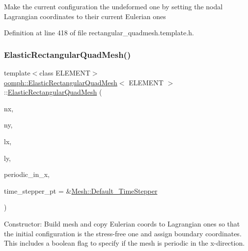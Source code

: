 Make the current configuration the undeformed one by setting the nodal Lagrangian coordinates to their current Eulerian ones 

Definition at line 418 of file rectangular\+\_\+quadmesh.\+template.\+h.

\mbox{\label{classoomph_1_1ElasticRectangularQuadMesh_a3865acefe6df1aac212d8306f516ebd1}} 
\subsubsection{\texorpdfstring{Elastic\+Rectangular\+Quad\+Mesh()}{ElasticRectangularQuadMesh()}\hspace{0.1cm}{\footnotesize\ttfamily [3/3]}}
{\footnotesize\ttfamily template$<$class E\+L\+E\+M\+E\+NT$>$ \\
\hyperlink{classoomph_1_1ElasticRectangularQuadMesh}{oomph\+::\+Elastic\+Rectangular\+Quad\+Mesh}$<$ E\+L\+E\+M\+E\+NT $>$\+::\hyperlink{classoomph_1_1ElasticRectangularQuadMesh}{Elastic\+Rectangular\+Quad\+Mesh} (\begin{DoxyParamCaption}\item[{const unsigned \&}]{nx,  }\item[{const unsigned \&}]{ny,  }\item[{const double \&}]{lx,  }\item[{const double \&}]{ly,  }\item[{const bool \&}]{periodic\+\_\+in\+\_\+x,  }\item[{\hyperlink{classoomph_1_1TimeStepper}{Time\+Stepper} $\ast$}]{time\+\_\+stepper\+\_\+pt = {\ttfamily \&\hyperlink{classoomph_1_1Mesh_a12243d0fee2b1fcee729ee5a4777ea10}{Mesh\+::\+Default\+\_\+\+Time\+Stepper}} }\end{DoxyParamCaption})\hspace{0.3cm}{\ttfamily [inline]}}



Constructor\+: Build mesh and copy Eulerian coords to Lagrangian ones so that the initial configuration is the stress-\/free one and assign boundary coordinates. This includes a boolean flag to specify if the mesh is periodic in the x-\/direction. 

